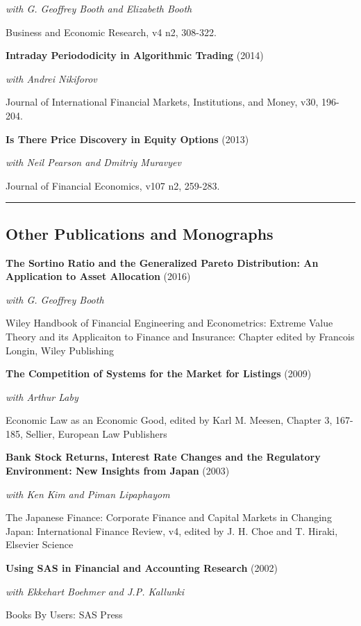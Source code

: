 \documentclass[11pt,a4paper,]{awesome-cv}
\begin{document}
\textit{with G. Geoffrey Booth and Elizabeth Booth}

Business and Economic Research, v4 n2, 308-322.

\textbf{Intraday Periododicity in Algorithmic Trading} (2014)

\textit{with Andrei Nikiforov}

Journal of International Financial Markets, Institutions, and Money,
v30, 196-204.

\textbf{Is There Price Discovery in Equity Options} (2013)

\textit{with Neil Pearson and Dmitriy Muravyev}

Journal of Financial Economics, v107 n2, 259-283.

\vspace{0.5cm}
\hrule
\vspace{0.3cm}
\subsection{Other Publications and Monographs}

\textbf{The Sortino Ratio and the Generalized Pareto Distribution: An Application to Asset Allocation}
(2016)

\textit{with G. Geoffrey Booth}

Wiley Handbook of Financial Engineering and Econometrics: Extreme Value
Theory and its Applicaiton to Finance and Insurance: Chapter edited by
Francois Longin, Wiley Publishing

\textbf{The Competition of Systems for the Market for Listings} (2009)

\textit{with Arthur Laby}

Economic Law as an Economic Good, edited by Karl M. Meesen, Chapter 3,
167-185, Sellier, European Law Publishers

\textbf{Bank Stock Returns, Interest Rate Changes and the Regulatory Environment: New Insights from Japan}
(2003)

\textit{with Ken Kim and Piman Lipaphayom}

The Japanese Finance: Corporate Finance and Capital Markets in Changing
Japan: International Finance Review, v4, edited by J. H. Choe and T.
Hiraki, Elsevier Science

\textbf{Using SAS in Financial  and Accounting Research} (2002)

\textit{with Ekkehart Boehmer and J.P. Kallunki}

Books By Users: SAS Press
\end{document}
